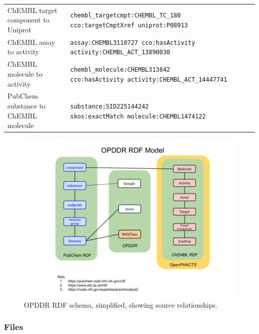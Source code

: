 \begin{table}
\begin{tabular}{p{0.25\linewidth}p{0.75\linewidth}}
ChEMBL target component to Uniprot & \makecell[l]{\texttt{chembl\_targetcmpt:CHEMBL\_TC\_180} \\ \texttt{cco:targetCmptXref uniprot:P08913}} \\
ChEMBL assay to activity & \makecell[l]{\texttt{assay:CHEMBL3110727 cco:hasActivity} \\ \texttt{activity:CHEMBL\_ACT\_13890030}} \\
ChEMBL molecule to activity & \makecell[l]{\texttt{chembl\_molecule:CHEMBL313842} \\ \texttt{cco:hasActivity activity:CHEMBL\_ACT\_14447741}} \\
PubChem substance to ChEMBL molecule & \makecell[l]{\texttt{substance:SID225144242} \\ \texttt{skos:exactMatch molecule:CHEMBL1474122}}  \\
\hline
\end{tabular}
\end{table}

\begin{figure}
    \centering
    \includegraphics[width=\linewidth]{figures/opddr/OPDDR_schema.png}
    \caption{OPDDR RDF schema, simplified, showing source relationships.}
    \label{fig:opddr_01}
\end{figure}

\subsubsection{Files}

